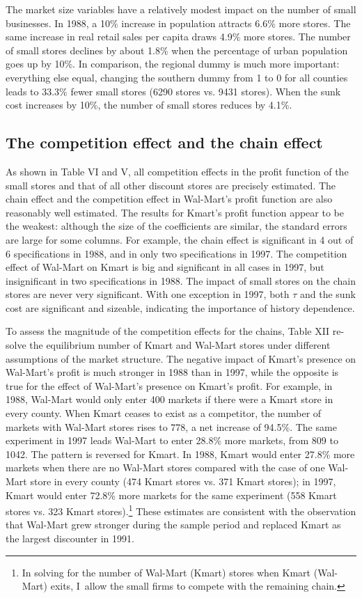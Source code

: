 \documentclass[notitlepage,onecolumn,11pt]{article}
\begin{document}
The market size variables have a relatively modest impact on the number of
small businesses. In 1988, a 10\% increase in population attracts 6.6\% more
stores. The same increase in real retail sales per capita draws 4.9\% more
stores. The number of small stores declines by about 1.8\% when the
percentage of urban population goes up by 10\%. In comparison, the regional
dummy is much more important: everything else equal, changing the southern
dummy from 1 to 0 for all counties leads to 33.3\% fewer small stores (6290
stores vs. 9431 stores). When the sunk cost increases by 10\%, the number of
small stores reduces by 4.1\%.

\subsection{The competition effect and the chain effect}

As shown in Table VI and V, all competition effects in the profit function
of the small stores and that of all other discount stores are precisely
estimated. The chain effect and the competition effect in Wal-Mart's profit
function are also reasonably well estimated. The results for Kmart's profit
function appear to be the weakest: although the size of the coefficients are
similar, the standard errors are large for some columns. For example, the
chain effect is significant in 4 out of 6 specifications in 1988, and in
only two specifications in 1997. The competition effect of Wal-Mart on Kmart
is big and significant in all cases in 1997, but insignificant in two
specifications in 1988. The impact of small stores on the chain stores are
never very significant. With one exception in 1997, both $\tau $ and the
sunk cost are significant and sizeable, indicating the importance of history
dependence.

To assess the magnitude of the competition effects for the chains, Table XII
re-solve the equilibrium number of Kmart and Wal-Mart stores under different
assumptions of the market structure. The negative impact of Kmart's presence
on Wal-Mart's profit is much stronger in 1988 than in 1997, while the
opposite is true for the effect of Wal-Mart's presence on Kmart's profit.
For example, in 1988, Wal-Mart would only enter 400 markets if there were a
Kmart store in every county. When Kmart ceases to exist as a competitor, the
number of markets with Wal-Mart stores rises to 778, a net increase of
94.5\%. The same experiment in 1997 leads Wal-Mart to enter 28.8\% more
markets, from 809 to 1042. The pattern is reversed for Kmart. In 1988, Kmart
would enter 27.8\% more markets when there are no Wal-Mart stores compared
with the case of one Wal-Mart store in every county (474 Kmart stores vs.
371 Kmart stores); in 1997, Kmart would enter 72.8\% more markets for the
same experiment (558 Kmart stores vs. 323 Kmart stores).\footnote{%
In solving for the number of Wal-Mart (Kmart) stores when Kmart (Wal-Mart)
exits, I\ allow the small firms to compete with the remaining chain.} These
estimates are consistent with the observation that Wal-Mart grew stronger
during the sample period and replaced Kmart as the largest discounter in
1991.
\end{document}
